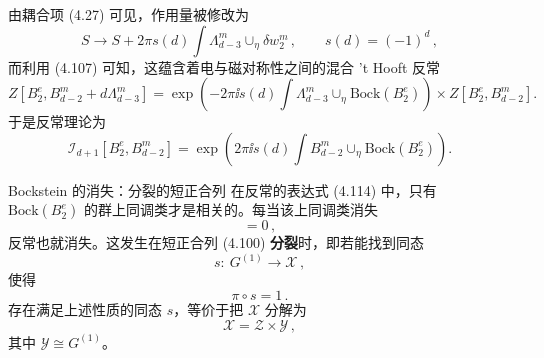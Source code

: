 由耦合项 (4.27) 可见，作用量被修改为
\begin{equation}
S\to S+2\pi s(d)\int \Lambda^m_{d-3}\cup_\eta\delta w^m_2\,,\qquad s(d)=(-1)^d\,,
\tag{4.112}
\end{equation}
而利用 (4.107) 可知，这蕴含着电与磁对称性之间的混合 't Hooft 反常
\begin{equation}
Z\left[B_2^e,B^m_{d-2}+d\Lambda^m_{d-3}\right]=\exp\left(-2\pi\ii s(d)\int\Lambda^m_{d-3}\cup_\eta\mathrm{Bock}(B_2^e)\right)\times Z\left[B_2^e,B^m_{d-2}\right].
\tag{4.113}
\end{equation}
于是反常理论为
\begin{equation}
\mathcal{I}_{d+1}[B_2^e,B^m_{d-2}]=\exp\left(2\pi\ii s(d)\int B^m_{d-2}\cup_\eta\mathrm{Bock}(B_2^e)\right).
\tag{4.114}
\end{equation}


\begin{notebox}{Bockstein 的消失：分裂的短正合列}
在反常的表达式 (4.114) 中，只有 $\mathrm{Bock}(B_2^e)$ 的群上同调类才是相关的。每当该上同调类消失
\begin{equation}
[\mathrm{Bock}(B_2^e)]=0\,,
\tag{4.115}
\end{equation}
反常也就消失。这发生在短正合列 (4.100) \textbf{分裂}时，即若能找到同态
\begin{equation}
s:\ G^{(1)}\to\mathcal{X}\,,
\tag{4.116}
\end{equation}
使得
\begin{equation}
\pi\circ s=1\,.
\tag{4.117}
\end{equation}
存在满足上述性质的同态 $s$，等价于把 $\mathcal{X}$ 分解为
\begin{equation}
\mathcal{X}=\mathcal{Z}\times\mathcal{Y}\,,
\tag{4.118}
\end{equation}
其中 $\mathcal{Y}\cong G^{(1)}$。
\end{notebox}

